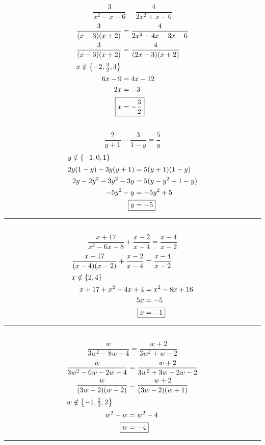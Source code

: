 	\subsection{}
		\[\frac{3}{x^2 - x - 6} = \frac{4}{2x^2 + x - 6}\]
		\begin{align*}
			\frac{3}{(x - 3)(x + 2)} &= \frac{4}{2x^2 + 4x - 3x - 6} \\
			\frac{3}{(x - 3)(x + 2)} &= \frac{4}{(2x - 3)(x + 2)} \\
			\intertext{$x \notin \left\{-2, \frac{3}{2}, 3\right\}$}
			6x - 9 &= 4x - 12 \\
			2x &= -3 \\
			\Aboxed{x &= -\frac{3}{2}}
		\end{align*}

	\subsection{}
		\[\frac{2}{y + 1} - \frac{3}{1 - y} = \frac{5}{y}\]
		\begin{align*}
			\intertext{$y \notin \{-1, 0, 1\}$}
			2y(1 - y) - 3y(y + 1) &= 5(y + 1)(1 - y) \\
			2y - 2y^2 - 3y^2 - 3y &= 5(y - y^2 + 1 - y) \\
			-5y^2 - y &= -5y^2 + 5 \\
			\Aboxed{y &= -5} \\
		\end{align*}
		\hrule{}

	\subsection{}
		\[\frac{x + 17}{x^2 - 6x + 8} + \frac{x - 2}{x - 4} = \frac{x - 4}{x - 2}\]
		\begin{align*}
			\frac{x + 17}{(x - 4)(x - 2)} + \frac{x - 2}{x - 4} &= \frac{x - 4}{x - 2} \\
			\intertext{$x \notin \{2, 4\}$}
			x + 17 + x^2 - 4x + 4 &= x^2 - 8x + 16 \\
			5x &= -5 \\
			\Aboxed{x &= -1}
		\end{align*}
		\hrule{}

	\subsection{}
		\[\frac{w}{3w^2 - 8w + 4} = \frac{w + 2}{3w^2 + w - 2}\]
		\begin{align*}
			\frac{w}{3w^2 - 6w - 2w + 4} &= \frac{w + 2}{3w^2 + 3w - 2w - 2} \\
			\frac{w}{(3w - 2)(w - 2)} &= \frac{w + 2}{(3w - 2)(w + 1)} \\
			\intertext{$w \notin \left\{-1, \frac{2}{3}, 2\right\}$}
			w^2 + w &= w^2 - 4 \\
			\Aboxed{w &= -4}
		\end{align*}
		\hrule{}

